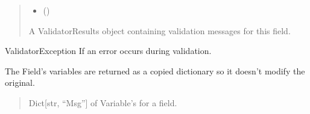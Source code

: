 \documentclass[letterpaper,10pt,english]{sphinxmanual}
\begin{document}
\begin{fulllineitems}
\begin{fulllineitems}
\begin{quote}
\begin{description}
\begin{itemize}
\item {} 
\sphinxAtStartPar
{} ()

\end{itemize}

\sphinxAtStartPar
A ValidatorResults object containing validation messages for this field.

\end{description}\end{quote}
\begin{description}
\sphinxAtStartPar
ValidatorException If an error occurs during validation.

\end{description}

\end{fulllineitems}


\begin{fulllineitems}
\label{\detokenize{apache_commons_validator_python:apache_commons_validator_python.field_new.Field.vars}}
\pysigstartsignatures
{}
\pysigstopsignatures
\sphinxAtStartPar
The Field’s variables are returned as a copied dictionary so it doesn’t
modify the original.
\begin{quote}\begin{description}
\sphinxAtStartPar
Dict{[}str, “Msg”{]} of Variable’s for a field.

\end{description}\end{quote}

\end{fulllineitems}


\end{fulllineitems}
\end{document}
